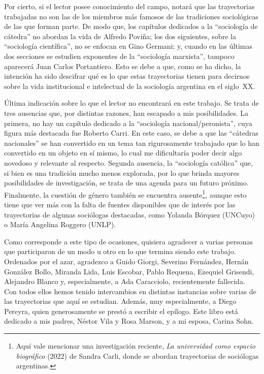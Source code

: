 Por cierto, si el lector posee conocimiento del campo, notará que las trayectorias trabajadas no son las de los miembros más famosos de las tradiciones sociológicas de las que forman parte. De modo que, los capítulos dedicados a la \enquote{sociología de cátedra} no abordan la vida de Alfredo Poviña; los dos siguientes, sobre la \enquote{sociología científica}, no se enfocan en Gino Germani; y, cuando en las últimas dos secciones se estudien exponentes de la \enquote{sociología marxista}, tampoco aparecerá Juan Carlos Portantiero. Esto se debe a que, como se ha dicho, la intención ha sido descifrar qué es lo que estas trayectorias tienen para decirnos sobre la vida institucional e intelectual de la sociología argentina en el siglo~XX.

Última indicación sobre lo que el lector no encontrará en este trabajo. Se trata de tres ausencias que, por distintas razones, han escapado a mis posibilidades. La primera, no hay un capítulo dedicado a la \enquote{sociología nacional/peronista}, cuya figura más destacada fue Roberto Carri. En este caso, se debe a que las \enquote{cátedras nacionales} se han convertido en un tema tan rigurosamente trabajado que lo han convertido en un objeto en sí mismo, lo cual me dificultaría poder decir algo novedoso y relevante al respecto. Segunda ausencia, la \enquote{sociología católica} que, si bien es una tradición mucho menos explorada, por lo que brinda mayores posibilidades de investigación, se trata de una agenda para un futuro próximo. Finalmente, la cuestión de género también se encuentra ausente\footnote{Aquí vale mencionar una investigación reciente, \emph{La universidad como espacio biográfico} (2022) de Sandra Carli, donde se abordan trayectorias de sociólogas argentinas.}, aunque esto tiene que ver más con la falta de fuentes disponibles que de interés por las trayectorias de algunas sociólogas destacadas, como Yolanda Bórquez (UNCuyo) o María Angelina Roggero (UNLP).

\froufrou

Como corresponde a este tipo de ocasiones, quisiera agradecer a varias personas que participaron de un modo u otro en lo que termina siendo este trabajo. Ordenados por el azar, agradezco a Guido Giorgi, Severino Fernández, Hernán González Bollo, Miranda Lida, Luis Escobar, Pablo Requena, Ezequiel Grisendi, Alejandro Blanco y, especialmente, a Ada Caracciolo, recientemente fallecida. Con todos ellos hemos tenido intercambios en distintas instancias sobre varias de las trayectorias que aquí se estudian. Además, muy especialmente, a Diego Pereyra, quien generosamente se prestó a escribir el epílogo. Este libro está dedicado a mis padres, Néstor Vila y Rosa Marson, y a mi esposa, Carina Sohn.

